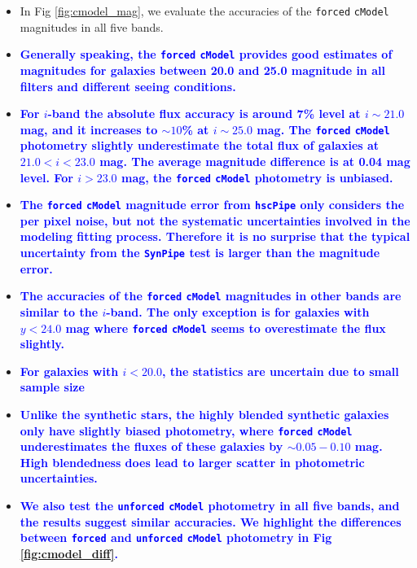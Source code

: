 \documentclass[useamsfonts]{pasj01}
\def\hscpipe{\texttt{hscPipe}}
\def\synpipe{\texttt{SynPipe}}
\def\cmodel{\texttt{cModel}}
\def\forced{\texttt{forced}}
\def\unforced{\texttt{unforced}}
\newcommand{\plan}[1]{\textcolor{blue} {\textbf{#1}}}
\begin{document}
    \begin{itemize}
    
        \item In Fig \ref{fig:cmodel_mag}, we evaluate the accuracies of the \forced{}
            \cmodel{} magnitudes in all five bands.
            
        \item \plan{Generally speaking, the \forced{} \cmodel{} provides good estimates 
            of magnitudes for galaxies between 20.0 and 25.0 magnitude in all filters and 
            different seeing conditions. }
            
        \item \plan{For $i$-band the absolute flux accuracy is around 7\% level at 
            $i{\sim}21.0$ mag, and it increases to ${\sim}10$\% at $i{\sim}25.0$ mag.
            The \forced{} \cmodel{} photometry slightly underestimate the total flux of 
            galaxies at $21.0 < i < 23.0$ mag. 
            The average magnitude difference is at 0.04 mag level. 
            For $i > 23.0$ mag, the \forced{} \cmodel{} photometry is unbiased.}
            
        \item \plan{The \forced{} \cmodel{} magnitude error from \hscpipe{} only considers 
            the per pixel noise, but not the systematic uncertainties involved in the 
            modeling fitting process.
            Therefore it is no surprise that the typical uncertainty from the \synpipe{} 
            test is larger than the magnitude error.}
            
        \item \plan{The accuracies of the \forced{} \cmodel{} magnitudes in other bands 
            are similar to the $i$-band.  
            The only exception is for galaxies with $y<24.0$ mag where \forced{} \cmodel{}
            seems to overestimate the flux slightly.}
        
        \item \plan{For galaxies with $i < 20.0$, the statistics are uncertain due to small 
            sample size}
            
        \item \plan{Unlike the synthetic stars, the highly blended synthetic galaxies only 
            have slightly biased photometry, where \forced{} \cmodel{} underestimates the 
            fluxes of these galaxies by ${\sim}0.05-0.10$ mag. 
            High blendedness does lead to larger scatter in photometric uncertainties.} 
           
       \item \plan{We also test the \unforced{} \cmodel{} photometry in all five bands, 
           and the results suggest similar accuracies.
           We highlight the differences between \forced{} and 
           \unforced{} \cmodel{} photometry in Fig \ref{fig:cmodel_diff}.}
    
    \end{itemize}
\end{document}
